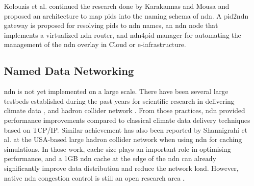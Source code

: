 \documentclass[conference]{IEEEtran}
\begin{document}
Kolouzis et al. continued the research done by Karakannas \cite{icn-bd} and Mousa \cite{ndn-app-aware} and proposed an architecture to map \glspl{pid} into the naming schema of \gls{ndn}. A \gls{pid}2\gls{ndn} gateway is proposed for resolving \glspl{pid} to \gls{ndn} names, an \gls{ndn} node that implements a virtualized \gls{ndn} router, and  \gls{ndn}4\gls{pid} manager for automating the management of the \gls{ndn} overlay in Cloud or e-infrastructure.

\subsection{Named Data Networking}
\gls{ndn} is not yet implemented on a large scale. There have been several large testbeds established during the past years for scientific research in delivering climate data \cite{lim2018ndn}, and hadron collider network \cite{shannigrahi2015named}. From those practices, \gls{ndn} provided performance improvements compared to classical climate data delivery techniques based on TCP/IP. Similar achievement has also been reported by Shannigrahi et al. at the USA-based large hadron collider network \cite{shannigrahi2015named} when using \gls{ndn} for caching simulations. In those work, cache size plays an important role in optimising performance, and a 1GB \gls{ndn} cache at the edge of the \gls{ndn} can already significantly improve data distribution and reduce the network load. However, native \gls{ndn} congestion control is still an open research area \cite{ren2016congestion}.

\end{document}
